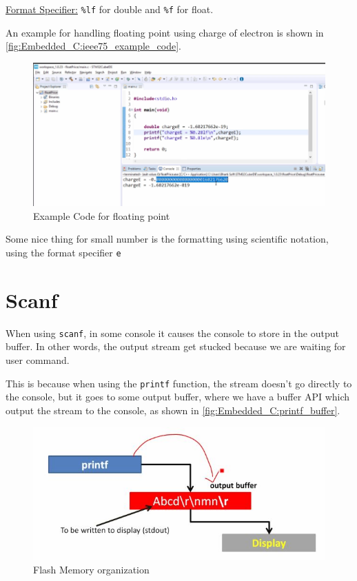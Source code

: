 \underline{Format Specifier:} \verb|%lf| for double and \verb|%f| for float.

An example for handling floating point using charge of electron is shown in \autoref{fig:Embedded_C:ieee75_example_code}.

\begin{figure}[h]
\centering
\includegraphics[scale=0.5]{Figures/Embedded_C/ieee75_example_code}
\caption{Example Code for floating point}
\label{fig:Embedded_C:ieee75_example_code}
\end{figure} 


Some nice thing for small number is the formatting using scientific notation, using the format specifier \verb|e|


\newpage

\section{Scanf}

When using \verb|scanf|, in some console it causes the console to store in the output buffer. In other words, the output stream get stucked because we are waiting for user command.

This is because when using the \verb|printf| function, the stream doesn't go directly to the console, but it goes to some output buffer, where we have a buffer API which output the stream to the console, as shown in \autoref{fig:Embedded_C:printf_buffer}.


\begin{figure}[h]
\centering
\includegraphics[scale=0.5]{Figures/Embedded_C/printf_buffer}
\caption{Flash Memory organization}
\label{fig:Embedded_C:printf_buffer}
\end{figure} 


